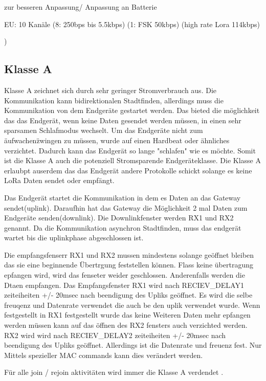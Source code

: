 \documentclass[a4paper,12pt]{article}
\begin{document}
        zur besseren Anpassung/ Anpassung an Batterie
        
        EU: 10 Kanäle (8: 250bps bis 5.5kbps) (1: FSK 50kbps) (high rate Lora 114kbps)

        )
        \subsection{Klasse A}\label{sec:ClassA}
            Klasse A zeichnet sich durch sehr geringer Stromverbrauch aus. Die Kommunikation kann bidirektionalen Stadtfinden, allerdings muss die Kommunikation von dem Endgeräte gestartet werden. Das bieted die möglichkeit das das Endgerät, wenn keine Daten gesendet werden müssen, in einen sehr
            sparsamen Schlafmodus wechselt. Um das Endgeräte nicht zum \"aufwachen\" zwingen zu müssen, wurde auf einen Hardbeat oder ähnliches verzichtet. Dadurch kann das Endgerät so lange "schlafen" wie es möchte. Somit ist die Klasse A auch die potenziell Stromsparende Endgeräteklasse. 
            Die Klasse A erlaubpt auserdem das das Endgerät andere Protokolle schickt solange es keine LoRa Daten sendet oder empfängt.
            
            Das Endgerät startet die Kommunikation in dem es Daten an das Gateway sendet(uplink). Daraufhin hat das Gateway die Möglichkeit 2 mal Daten zum Endgeräte senden(downlink). Die Downlinkfenster werden RX1 und RX2 genannt.
            Da die Kommunikation asynchron Stadtfinden, muss das endgerät wartet bis die uplinkphase abgeschlossen ist.

            Die empfangsfenserr RX1 und RX2 mussen mindestens solange geöffnet bleiben das sie eine beginnende Übertrgung feststellen können. Flass keine übertragung epfangen wird, wird das fenseter weider geschlossen. Anderenfalls werden die Dtaen empfangen.
            Das Empfangsfenster RX1 wird nach RECIEV\_DELAY1 zeiteiheiten +/- 20msec nach beendigung des Upliks geöffnet. Es wird die selbe freuqenz und Datenrate verwendet die auch be den uplik verwendet wurde.
            Wenn festgestellt in RX1 festgestellt wurde das keine Weiteren Daten mehr epfangen werden müssen kann auf das öffnen des RX2 fensters auch verzichted werden.
            RX2 wird wird nach RECIEV\_DELAY2 zeiteiheiten +/- 20msec nach beendigung des Upliks geöffnet. Allerdings ist die Datenrate und freuenz fest. Nur Mittels spezieller MAC commands kann dies verändert werden.
            
            Für alle join / rejoin aktivitäten wird immer die Klasse A verdendet .
\end{document}
